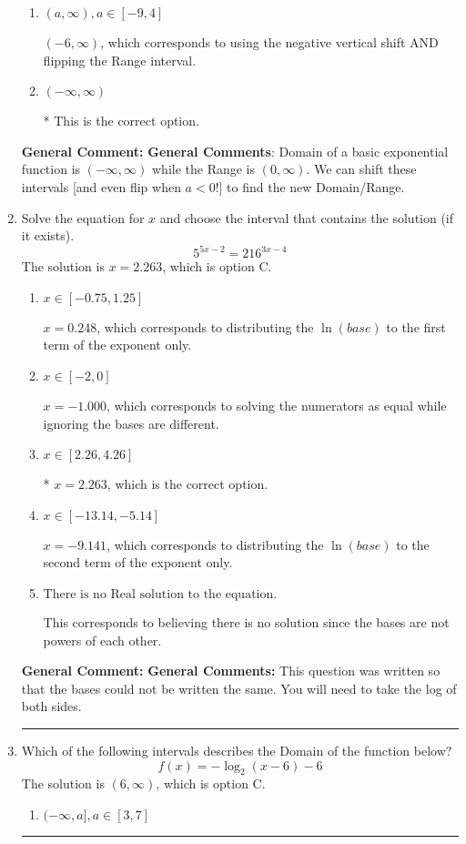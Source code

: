 \documentclass{extbook}[14pt]
\newcommand{\litem}[1]{\item #1

\rule{\textwidth}{0.4pt}}
\begin{document}
\begin{enumerate}
{\begin{enumerate}[label=\Alph*.]
$[-6, \infty)$, which corresponds to using the negative vertical shift AND flipping the Range interval AND including the endpoint.
\item \( (a, \infty), a \in [-9, 4] \)

$(-6, \infty)$, which corresponds to using the negative vertical shift AND flipping the Range interval.
\item \( (-\infty, \infty) \)

* This is the correct option.
\end{enumerate}

\textbf{General Comment:} \textbf{General Comments}: Domain of a basic exponential function is $(-\infty, \infty)$ while the Range is $(0, \infty)$. We can shift these intervals [and even flip when $a<0$!] to find the new Domain/Range.
}
\litem{
Solve the equation for $x$ and choose the interval that contains the solution (if it exists).
\[ 5^{5x-2} = 216^{3x-4} \]The solution is \( x = 2.263 \), which is option C.\begin{enumerate}[label=\Alph*.]
\item \( x \in [-0.75, 1.25] \)

$x = 0.248$, which corresponds to distributing the $\ln(base)$ to the first term of the exponent only.
\item \( x \in [-2, 0] \)

$x = -1.000$, which corresponds to solving the numerators as equal while ignoring the bases are different.
\item \( x \in [2.26, 4.26] \)

* $x = 2.263$, which is the correct option.
\item \( x \in [-13.14, -5.14] \)

$x = -9.141$, which corresponds to distributing the $\ln(base)$ to the second term of the exponent only.
\item \( \text{There is no Real solution to the equation.} \)

This corresponds to believing there is no solution since the bases are not powers of each other.
\end{enumerate}

\textbf{General Comment:} \textbf{General Comments:} This question was written so that the bases could not be written the same. You will need to take the log of both sides.
}
\litem{
Which of the following intervals describes the Domain of the function below?
\[ f(x) = -\log_2{(x-6)}-6 \]The solution is \( (6, \infty) \), which is option C.\begin{enumerate}[label=\Alph*.]
\item \( (-\infty, a], a \in [3, 7] \)


\end{enumerate}}
\end{enumerate}
\end{document}
